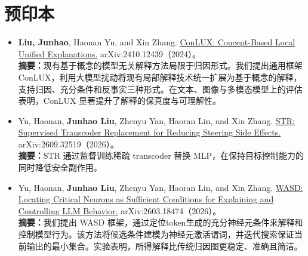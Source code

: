 \documentclass[letterpaper,11pt]{article}
\begin{document}
\section{预印本}
\begin{itemize}[leftmargin=*]
    \item \textbf{Liu, Junhao}, Haonan Yu, and Xin Zhang. \href{https://arxiv.org/pdf/2410.12439}{ConLUX: Concept-Based Local Unified Explanations.} arXiv:2410.12439（2024）。 \vspace{0.2cm}\\
        {\small \textbf{摘要：}现有基于概念的模型无关解释方法局限于归因形式。我们提出通用框架 ConLUX，利用大模型扰动将现有局部解释技术统一扩展为基于概念的解释，支持归因、充分条件和反事实三种形式。在文本、图像与多模态模型上的评估表明，ConLUX 显著提升了解释的保真度与可理解性。}

    \item Yu, Haonan, \textbf{Junhao Liu}, Zhenyu Yan, Haoran Lin, and Xin Zhang. \href{https://arxiv.org/abs/2609.32519}{STR: Supervised Transcoder Replacement for Reducing Steering Side Effects.} arXiv:2609.32519（2026）。\vspace{0.2cm}\\
        {\small \textbf{摘要：}STR 通过监督训练稀疏 transcoder 替换 MLP，在保持目标控制能力的同时降低安全副作用。}

    \item Yu, Haonan, \textbf{Junhao Liu}, Zhenyu Yan, Haoran Lin, and Xin Zhang. \href{https://arxiv.org/abs/2603.18474}{WASD: Locating Critical Neurons as Sufficient Conditions for Explaining and Controlling LLM Behavior.} arXiv:2603.18474（2026）。\vspace{0.2cm}\\
        {\small \textbf{摘要：}我们提出 WASD 框架，通过定位token生成的充分神经元条件来解释和控制模型行为。该方法将候选条件建模为神经元激活谓词，并迭代搜索保证当前输出的最小集合。实验表明，所得解释比传统归因图更稳定、准确且简洁。}
\end{itemize}


\end{document}
